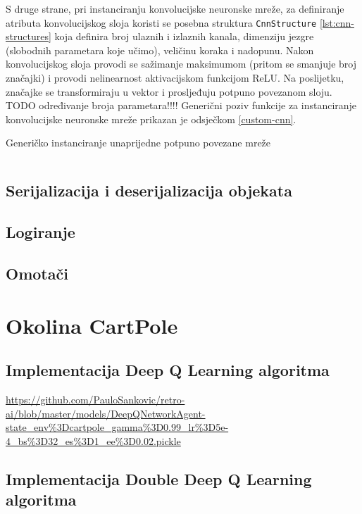 S druge strane, pri instanciranju konvolucijske neuronske mreže, za definiranje atributa konvolucijskog sloja koristi se posebna struktura \texttt{CnnStructure} \ref{lst:cnn-structures} koja definira broj ulaznih i izlaznih kanala, dimenziju jezgre (slobodnih parametara koje učimo), veličinu koraka i nadopunu. Nakon konvolucijskog sloja provodi se sažimanje maksimumom (pritom se smanjuje broj značajki) i provodi nelinearnost aktivacijskom funkcijom ReLU. Na poslijetku, značajke se transformiraju u vektor i prosljeđuju potpuno povezanom sloju. TODO određivanje broja parametara!!!! Generični poziv funkcije za instanciranje konvolucijske neuronske mreže prikazan je odsječkom \ref{custom-cnn}.

\begin{listing}[H]
    \caption{Generičko instanciranje unaprijedne potpuno povezane mreže}
    \inputminted{python}{snippets/structures.py}
    \label{lst:cnn-structures}
\end{listing}

\subsection{Serijalizacija i deserijalizacija objekata}

\subsection{Logiranje}

\subsection{Omotači}





\section{Okolina CartPole}

\subsection{Implementacija Deep Q Learning algoritma}

\url{https://github.com/PauloSankovic/retro-ai/blob/master/models/DeepQNetworkAgent-state_env\%3Dcartpole_gamma\%3D0.99_lr\%3D5e-4_bs\%3D32_es\%3D1_ee\%3D0.02.pickle}

\subsection{Implementacija Double Deep Q Learning algoritma}

